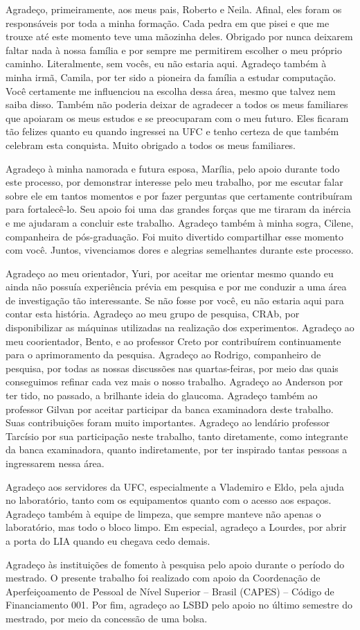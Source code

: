 Agradeço, primeiramente, aos meus pais, Roberto e Neila. Afinal, eles foram os responsáveis por toda a minha formação. Cada pedra em que pisei e que me trouxe até este momento teve uma mãozinha deles. Obrigado por nunca deixarem faltar nada à nossa família e por sempre me permitirem escolher o meu próprio caminho. Literalmente, sem vocês, eu não estaria aqui. Agradeço também à minha irmã, Camila, por ter sido a pioneira da família a estudar computação. Você certamente me influenciou na escolha dessa área, mesmo que talvez nem saiba disso. Também não poderia deixar de agradecer a todos os meus familiares que apoiaram os meus estudos e se preocuparam com o meu futuro. Eles ficaram tão felizes quanto eu quando ingressei na UFC e tenho certeza de que também celebram esta conquista. Muito obrigado a todos os meus familiares.

Agradeço à minha namorada e futura esposa, Marília, pelo apoio durante todo este processo, por demonstrar interesse pelo meu trabalho, por me escutar falar sobre ele em tantos momentos e por fazer perguntas que certamente contribuíram para fortalecê-lo. Seu apoio foi uma das grandes forças que me tiraram da inércia e me ajudaram a concluir este trabalho. Agradeço também à minha sogra, Cilene, companheira de pós-graduação. Foi muito divertido compartilhar esse momento com você. Juntos, vivenciamos dores e alegrias semelhantes durante este processo.

Agradeço ao meu orientador, Yuri, por aceitar me orientar mesmo quando eu ainda não possuía experiência prévia em pesquisa e por me conduzir a uma área de investigação tão interessante. Se não fosse por você, eu não estaria aqui para contar esta história. Agradeço ao meu grupo de pesquisa, CRAb, por disponibilizar as máquinas utilizadas na realização dos experimentos. Agradeço ao meu coorientador, Bento, e ao professor Creto por contribuírem continuamente para o aprimoramento da pesquisa. Agradeço ao Rodrigo, companheiro de pesquisa, por todas as nossas discussões nas quartas-feiras, por meio das quais conseguimos refinar cada vez mais o nosso trabalho. Agradeço ao Anderson por ter tido, no passado, a brilhante ideia do glaucoma. Agradeço também ao professor Gilvan por aceitar participar da banca examinadora deste trabalho. Suas contribuições foram muito importantes. Agradeço ao lendário professor Tarcísio por sua participação neste trabalho, tanto diretamente, como integrante da banca examinadora, quanto indiretamente, por ter inspirado tantas pessoas a ingressarem nessa área.

Agradeço aos servidores da UFC, especialmente a Vlademiro e Eldo, pela ajuda no laboratório, tanto com os equipamentos quanto com o acesso aos espaços. Agradeço também à equipe de limpeza, que sempre manteve não apenas o laboratório, mas todo o bloco limpo. Em especial, agradeço a Lourdes, por abrir a porta do LIA quando eu chegava cedo demais.

Agradeço às instituições de fomento à pesquisa pelo apoio durante o período do mestrado. O presente trabalho foi realizado com apoio da Coordenação de Aperfeiçoamento de Pessoal de Nível Superior -- Brasil (CAPES) -- Código de Financiamento 001. Por fim, agradeço ao LSBD pelo apoio no último semestre do mestrado, por meio da concessão de uma bolsa.